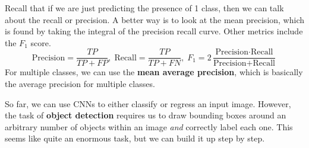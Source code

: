   Recall that if we are just predicting the presence of 1 class, then we can talk about the recall or precision. A better way is to look at the mean precision, which is found by taking the integral of the precision recall curve. Other metrics include the $F_1$ score. 
  \[\text{Precision} = \frac{TP}{TP + FP}, \; \text{Recall} = \frac{TP}{TP + FN}, \; F_1 = 2 \frac{\text{Precision} \cdot \text{Recall}}{\text{Precision} + \text{Recall}}\]
  For multiple classes, we can use the \textbf{mean average precision}, which is basically the average precision for multiple classes.

  So far, we can use CNNs to either classify or regress an input image. However, the task of \textbf{object detection} requires us to draw bounding boxes around an arbitrary number of objects within an image \textit{and} correctly label each one. This seems like quite an enormous task, but we can build it up step by step. 

